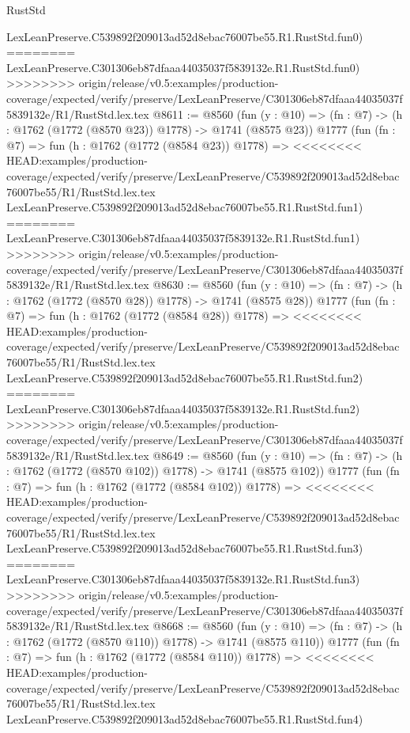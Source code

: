 \begin{lexlean}{RustStd}
\begin{coremodule}
{\begin{coremodule}
{{{{{{{{{{{{{{{    LexLeanPreserve.C539892f209013ad52d8ebac76007be55.R1.RustStd.fun0)
========
    LexLeanPreserve.C301306eb87dfaaa44035037f5839132e.R1.RustStd.fun0)
>>>>>>>> origin/release/v0.5:examples/production-coverage/expected/verify/preserve/LexLeanPreserve/C301306eb87dfaaa44035037f5839132e/R1/RustStd.lex.tex
@8611 := @8560
    (fun (y : @10) => (fn : @7) -> (h : @1762 (@1772 (@8570 @23)) @1778) -> @1741 (@8575 @23))
    @1777
    (fun (fn : @7) =>
    fun (h : @1762 (@1772 (@8584 @23)) @1778) =>
<<<<<<<< HEAD:examples/production-coverage/expected/verify/preserve/LexLeanPreserve/C539892f209013ad52d8ebac76007be55/R1/RustStd.lex.tex
    LexLeanPreserve.C539892f209013ad52d8ebac76007be55.R1.RustStd.fun1)
========
    LexLeanPreserve.C301306eb87dfaaa44035037f5839132e.R1.RustStd.fun1)
>>>>>>>> origin/release/v0.5:examples/production-coverage/expected/verify/preserve/LexLeanPreserve/C301306eb87dfaaa44035037f5839132e/R1/RustStd.lex.tex
@8630 := @8560
    (fun (y : @10) => (fn : @7) -> (h : @1762 (@1772 (@8570 @28)) @1778) -> @1741 (@8575 @28))
    @1777
    (fun (fn : @7) =>
    fun (h : @1762 (@1772 (@8584 @28)) @1778) =>
<<<<<<<< HEAD:examples/production-coverage/expected/verify/preserve/LexLeanPreserve/C539892f209013ad52d8ebac76007be55/R1/RustStd.lex.tex
    LexLeanPreserve.C539892f209013ad52d8ebac76007be55.R1.RustStd.fun2)
========
    LexLeanPreserve.C301306eb87dfaaa44035037f5839132e.R1.RustStd.fun2)
>>>>>>>> origin/release/v0.5:examples/production-coverage/expected/verify/preserve/LexLeanPreserve/C301306eb87dfaaa44035037f5839132e/R1/RustStd.lex.tex
@8649 := @8560
    (fun (y : @10) => (fn : @7) -> (h : @1762 (@1772 (@8570 @102)) @1778) -> @1741 (@8575 @102))
    @1777
    (fun (fn : @7) =>
    fun (h : @1762 (@1772 (@8584 @102)) @1778) =>
<<<<<<<< HEAD:examples/production-coverage/expected/verify/preserve/LexLeanPreserve/C539892f209013ad52d8ebac76007be55/R1/RustStd.lex.tex
    LexLeanPreserve.C539892f209013ad52d8ebac76007be55.R1.RustStd.fun3)
========
    LexLeanPreserve.C301306eb87dfaaa44035037f5839132e.R1.RustStd.fun3)
>>>>>>>> origin/release/v0.5:examples/production-coverage/expected/verify/preserve/LexLeanPreserve/C301306eb87dfaaa44035037f5839132e/R1/RustStd.lex.tex
@8668 := @8560
    (fun (y : @10) => (fn : @7) -> (h : @1762 (@1772 (@8570 @110)) @1778) -> @1741 (@8575 @110))
    @1777
    (fun (fn : @7) =>
    fun (h : @1762 (@1772 (@8584 @110)) @1778) =>
<<<<<<<< HEAD:examples/production-coverage/expected/verify/preserve/LexLeanPreserve/C539892f209013ad52d8ebac76007be55/R1/RustStd.lex.tex
    LexLeanPreserve.C539892f209013ad52d8ebac76007be55.R1.RustStd.fun4)
}}}}}}}}}}}}}}}
\end{coremodule}}
\end{coremodule}
\end{lexlean}
